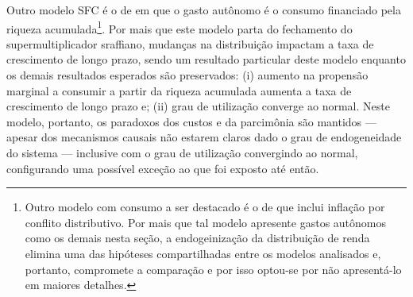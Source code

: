 Outro modelo SFC é o de \textcite{brochier_supermultiplier_2018} em que o gasto autônomo é o consumo financiado pela riqueza acumulada\footnote{
	Outro modelo com consumo a ser destacado é o de \textcite{nah_role_2019} %
	que inclui inflação por conflito distributivo. Por mais que tal modelo apresente gastos autônomos como os demais nesta seção, a endogeinização da distribuição de renda elimina uma das hipóteses compartilhadas entre os modelos analisados e, portanto, compromete a comparação e por isso optou-se por não apresentá-lo em maiores detalhes.
}. 
Por mais que este modelo parta do fechamento do supermultiplicador sraffiano,
mudanças na distribuição impactam a taxa de crescimento de longo prazo, sendo um resultado particular deste modelo enquanto os demais resultados esperados são preservados: (i) aumento na propensão marginal a consumir a partir da riqueza acumulada aumenta a taxa de crescimento de longo prazo e; 
	(ii) grau de utilização converge ao normal.
Neste modelo, portanto, os paradoxos dos custos e da parcimônia são mantidos --- apesar dos mecanismos causais não estarem claros dado o grau de endogeneidade do sistema --- inclusive com o grau de utilização convergindo ao normal, configurando uma possível exceção ao que foi exposto até então.






